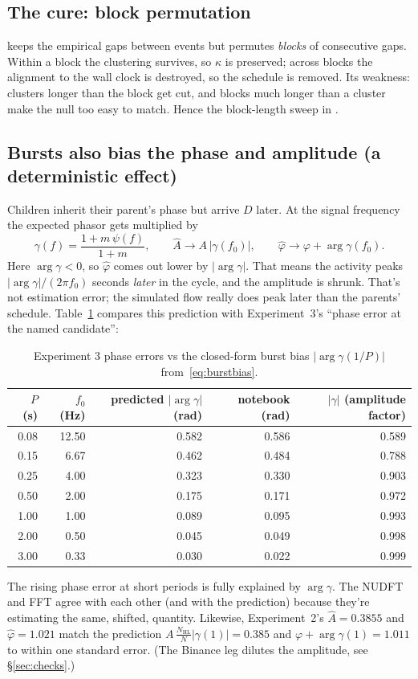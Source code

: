 \documentclass[11pt,a4paper]{article}
\newcommand{\code}[1]{\texttt{\detokenize{#1}}}
\begin{document}
\subsection{The cure: block permutation}
\code{shuffle_null} keeps the empirical gaps between events but permutes \emph{blocks} of consecutive gaps. Within a block the
clustering survives, so $\kappa$ is preserved; across blocks the alignment to the wall clock is destroyed, so the
schedule is removed. Its weakness: clusters longer than the block get cut, and blocks much longer than a cluster make the null too
easy to match. Hence the block-length sweep in \code{run_analysis}.

\subsection{Bursts also bias the phase and amplitude (a deterministic effect)}
Children inherit their parent's phase but arrive $D$ later. At the signal frequency the expected phasor gets multiplied by
\begin{equation}\label{eq:burstbias}
  \gamma(f) = \frac{1+m\,\psi(f)}{1+m},\qquad
  \hat A \to A\,|\gamma(f_0)|,\qquad \hat\varphi\to\varphi+\arg\gamma(f_0).
\end{equation}
Here $\arg\gamma<0$, so $\hat\varphi$ comes out lower by $|\arg\gamma|$. That means the activity peaks $|\arg\gamma|/(2\pi f_0)$ seconds \emph{later} in the cycle, and the amplitude is shrunk. That's not estimation error; the
simulated flow really does peak later than the parents' schedule. Table~\ref{tab:sweep} compares this prediction with Experiment~3's ``phase error at the named
candidate'':
\begin{table}[h]\centering
\caption{Experiment 3 phase errors vs the closed-form burst bias $|\arg\gamma(1/P)|$ from~\eqref{eq:burstbias}.}\label{tab:sweep}
\begin{tabular}{rrrrr}
\toprule
$P$ (s) & $f_0$ (Hz) & predicted $|\arg\gamma|$ (rad) & notebook \code{nu_pherr} (rad) & $|\gamma|$ (amplitude factor)\\
\midrule
0.08 & 12.50 & 0.582 & 0.586 & 0.589\\
0.15 &  6.67 & 0.462 & 0.484 & 0.788\\
0.25 &  4.00 & 0.323 & 0.330 & 0.903\\
0.50 &  2.00 & 0.175 & 0.171 & 0.972\\
1.00 &  1.00 & 0.089 & 0.095 & 0.993\\
2.00 &  0.50 & 0.045 & 0.049 & 0.998\\
3.00 &  0.33 & 0.030 & 0.022 & 0.999\\
\bottomrule
\end{tabular}
\end{table}
The rising phase error at short periods is fully explained by $\arg\gamma$. The NUDFT and FFT agree with each other (and with the prediction) because
they're estimating the same, shifted, quantity. Likewise, Experiment~2's $\hat A = 0.3855$ and $\hat\varphi = 1.021$ match the prediction
$A\,\tfrac{N_{\mathrm{HL}}}{N}|\gamma(1)| = 0.385$ and $\varphi+\arg\gamma(1)=1.011$ to within one standard error. (The Binance leg dilutes the amplitude, see \S\ref{sec:checks}.)
\end{document}
